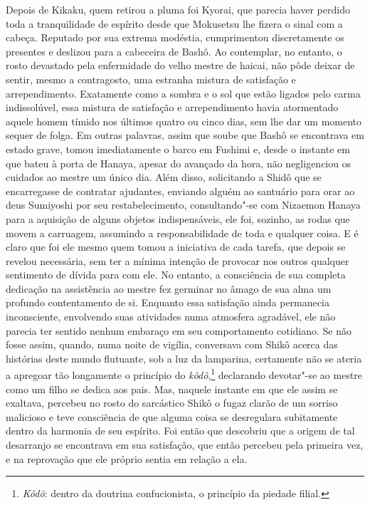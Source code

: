 Depois de Kikaku, quem retirou a pluma foi Kyorai, que parecia haver
perdido toda a tranquilidade de espírito desde que Mokusetsu lhe fizera
o sinal com a cabeça. Reputado por sua extrema modéstia, cumprimentou
discretamente os presentes e deslizou para a cabeceira de Bashô. Ao
contemplar, no entanto, o rosto devastado pela enfermidade do velho
mestre de haicai, não pôde deixar de sentir, mesmo a contragosto, uma
estranha mistura de satisfação e arrependimento. Exatamente como a
sombra e o sol que estão ligados pelo carma indissolúvel, essa mistura
de satisfação e arrependimento havia atormentado aquele homem tímido
nos últimos quatro ou cinco dias, sem lhe dar um momento sequer de
folga. Em outras palavras, assim que soube que Bashô se encontrava em
estado grave, tomou imediatamente o barco em Fushimi e, desde o
instante em que bateu à porta de Hanaya, apesar do avançado da hora,
não negligenciou os cuidados ao mestre um único dia. Além disso,
solicitando a Shidô que se encarregasse de contratar ajudantes,
enviando alguém ao santuário para orar ao deus Sumiyoshi por seu
restabelecimento, consultando"-se com Nizaemon Hanaya para a aquisição
de alguns objetos indispensáveis, ele foi, sozinho, as rodas que movem 
a carruagem, assumindo a responsabilidade de toda e
qualquer coisa. E é claro que foi ele mesmo quem tomou a iniciativa de
cada tarefa, que depois se revelou necessária, sem ter a mínima
intenção de provocar nos outros qualquer sentimento de dívida para com
ele. No entanto, a consciência de sua completa dedicação na assistência
ao mestre fez germinar no âmago de sua alma um profundo contentamento
de si. Enquanto essa satisfação ainda permanecia inconsciente,
envolvendo suas atividades numa atmosfera agradável, ele não parecia
ter sentido nenhum embaraço em seu comportamento cotidiano. Se não
fosse assim, quando, numa noite de vigília, conversava com Shikô acerca
das histórias deste  mundo flutuante, sob a luz da lamparina,
certamente não se ateria a apregoar tão longamente o princípio do
\textit{kôdô},\footnote{ \textit{Kôdô}: dentro da doutrina
confucionista, o princípio da piedade filial.} declarando
devotar"-se ao mestre como um filho se dedica aos pais. Mas, naquele
instante em que ele assim se exaltava, percebeu no rosto do sarcástico
Shikô o fugaz clarão de um sorriso malicioso e teve consciência de que
alguma coisa se desregulara subitamente dentro da harmonia de seu
espírito. Foi então que descobriu que a origem de tal desarranjo se
encontrava em sua satisfação, que então percebeu pela primeira vez, e
na reprovação que ele próprio sentia em relação a ela.

